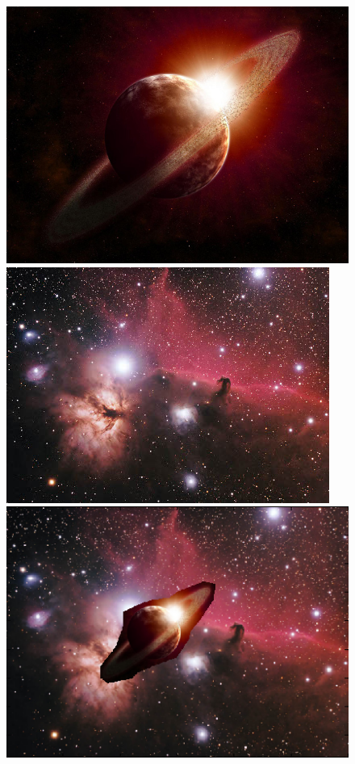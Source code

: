 \documentclass[11pt]{article}
\begin{document}
\quad

\begin{figure} [ht]
\begin{center}
\includegraphics[scale=0.29]{results_poisson/set4/im1.jpg}  
\includegraphics[scale=0.155]{results_poisson/set4/im2.jpg}\\
\includegraphics[scale=0.54]{results_poisson/set4/im4.png} 

\end{center}
\end{figure}
\end{document}
